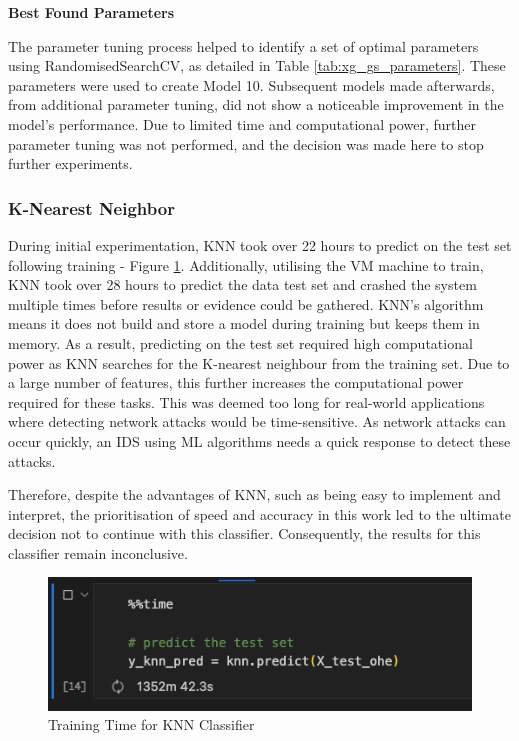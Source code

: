 \textbf{Best Found Parameters}
\medskip

The parameter tuning process helped to identify a set of optimal parameters using RandomisedSearchCV, as detailed in Table \ref{tab:xg_gs_parameters}. These parameters were used to create Model 10. Subsequent models made afterwards, from additional parameter tuning, did not show a noticeable improvement in the model's performance. Due to limited time and computational power, further parameter tuning was not performed, and the decision was made here to stop further experiments.

\subsubsection{K-Nearest Neighbor}

During initial experimentation, KNN took over 22 hours to predict on the test set following training - Figure \ref{fig:knn_train}. Additionally, utilising the VM machine to train, KNN took over 28 hours to predict the data test set and crashed the system multiple times before results or evidence could be gathered. KNN's algorithm means it does not build and store a model during training but keeps them in memory. As a result, predicting on the test set required high computational power as KNN searches for the K-nearest neighbour from the training set. Due to a large number of features, this further increases the computational power required for these tasks. This was deemed too long for real-world applications where detecting network attacks would be time-sensitive. As network attacks can occur quickly, an IDS using ML algorithms needs a quick response to detect these attacks.

Therefore, despite the advantages of KNN, such as being easy to implement and interpret, the prioritisation of speed and accuracy in this work led to the ultimate decision not to continue with this classifier. Consequently, the results for this classifier remain inconclusive.

\medskip

\begin{figure}[h]
\caption{Training Time for KNN Classifier}
\label{fig:knn_train}
\centering
\includegraphics[width=\textwidth]{Appendices/Images/knn_predict-2023-04-15.png}
\end{figure}